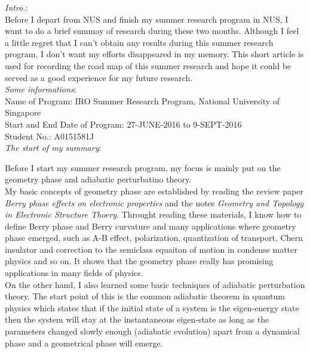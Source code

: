 \documentclass[fontsize=11pt, %
                             paper=a4, %
                             twoside, %
                             captions=tableheading,
                             index=totoc,
                             hyperref]{labbook}
\begin{document}
\begin{addmargin}[4cm]{0cm}
\emph{Intro.}:\\

Before I depart from NUS and finish my summer research program in NUS, I want to do a brief summay of research during these two months. Although I feel a little regret that I can't obtain any results during this summer research program, I don't want my efforts disappeared in my memory. This short article is used for recording the road map of this summer research and hope it could be served as a good experience for my future research.\\

\emph{Some informations}:\\

Name of Program: IRO Summer Research Program, National University of Singapore\\
Start and End Date of Program: 27-JUNE-2016 to 9-SEPT-2016\\
Student No.: A0151581J\\

\emph{The start of my summary}:

Before I start my summer research program, my focus is mainly put on the geometry phase and adiabatic perturbatino theory. \\

My basic concepts of geometry phase are established by reading the review paper \emph{Berry phase effects on electronic properties}\cite{XiaoChangNiu2010} and the notes \emph{Geometry and Topology  in Electronic Structure Thoery}\cite{Resta2016}. Throught reading these materials, I know how to define Berry phase and Berry curvature and many applications where geometry phase emerged, such as A-B effect, polarization, quantization of transport, Chern insulator and correction to the semiclass equaiton of motion in condense matter physics and so on. It shows that the geometry phase really has promising applications in many fields of physics. \\

On the other hand, I also learned some basic techniques of adiabatic perturbation theory. The start point of this is the common adiabatic theorem in quantum physics which states that if the initial state of a system is the eigen-energy state then the system will stay at the instantaneous eigen-state as long as the parameters changed slowly enough (adiabatic evolution) apart from a dynamical phase and a geometrical phase will emerge. \\


\end{addmargin}
\end{document}
